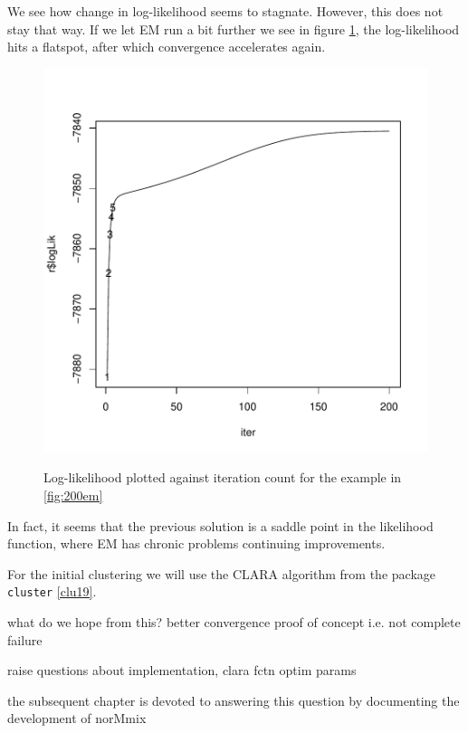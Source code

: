 We see how change in log-likelihood seems to stagnate. However, this does not 
stay that way. If we let EM run a bit further we see in figure \ref{fig:emll}, the log-likelihood hits 
a flatspot, after which convergence accelerates again.

\begin{figure}[h]
    \begin{Rgraph}[0.9]
\includegraphics{chapter1-figemll}
    \label{fig:emll}
    \caption{Log-likelihood plotted against iteration count for the example in 
             \ref{fig:200em}}
    \end{Rgraph}
\end{figure}

In fact, it seems that the previous solution is a saddle point in the likelihood
function, where EM has chronic problems continuing improvements.

\clearpage

For the initial clustering we will use the CLARA algorithm from the \Rp package
{\tt cluster} \ref{clu19}.

what do we hope from this?
better convergence
proof of concept i.e. not complete failure

raise questions about implementation,
clara fctn
optim params

the subsequent chapter is devoted to answering this question by documenting the 
development of norMmix



